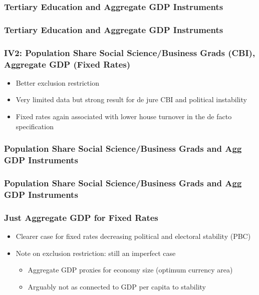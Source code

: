 \documentclass{beamer}
\begin{document}
    \begin{frame}
        \frametitle{Tertiary Education and Aggregate GDP Instruments}
        {
            \let\oldcentering\centering
            \renewcommand\centering{\tiny\oldcentering}
            
        }
    \end{frame}

    \begin{frame}
        \frametitle{Tertiary Education and Aggregate GDP Instruments}
        {
            \let\oldcentering\centering
            \renewcommand\centering{\tiny\oldcentering}
            
        }
    \end{frame}

    \begin{frame}
        \frametitle{IV2: Population Share Social Science/Business Grads (CBI), Aggregate GDP (Fixed Rates)}
        \begin{itemize}
            \item Better exclusion restriction
            \item Very limited data but strong result for de jure CBI and political instability
            \item Fixed rates again associated with lower house turnover in the de facto specification
        \end{itemize}
    \end{frame}

    \begin{frame}
        \frametitle{Population Share Social Science/Business Grads and Agg GDP Instruments}
        {
            \let\oldcentering\centering
            \renewcommand\centering{\tiny\oldcentering}
            
        }
    \end{frame}

    \begin{frame}
        \frametitle{Population Share Social Science/Business Grads and Agg GDP Instruments}
        {
            \let\oldcentering\centering
            \renewcommand\centering{\tiny\oldcentering}
            
        }
    \end{frame}

    \begin{frame}
        \frametitle{Just Aggregate GDP for Fixed Rates}
        \begin{itemize}
            \item Clearer case for fixed rates decreasing political and electoral stability (PBC)
            \item Note on exclusion restriction: still an imperfect case
            \begin{itemize}
                \item Aggregate GDP proxies for economy size (optimum currency area)
                \item Arguably not as connected to GDP per capita to stability
            \end{itemize}
        \end{itemize}
    \end{frame}
\end{document}

